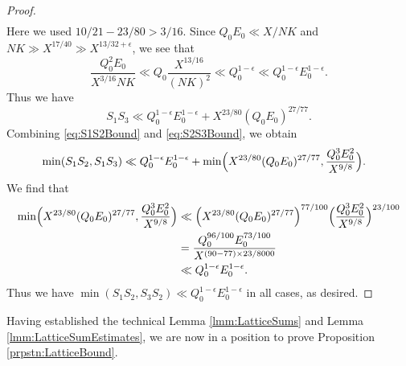 \documentclass[10pt]{amsart}
\theoremstyle{plain}
\numberwithin{sblmm}{thrm}
\numberwithin{equation}{section}
\begin{document}
\begin{proof}
\begin{align*}
\end{align*}
%
Here we used $10/21-23/80>3/16$. Since $Q_0 E_0\ll X/N K$ and $N K\gg X^{17/40}\gg X^{13/32+\epsilon}$, we see that
\[
\frac{Q_0^2 E_0}{X^{3/16}N K}\ll Q_0\frac{X^{13/16}}{(N K)^2}\ll Q_0^{1-\epsilon}\ll Q_0^{1-\epsilon}E_0^{1-\epsilon}.
\]
Thus we have
%
\begin{equation}
S_1S_3\ll Q_0^{1-\epsilon}E_0^{1-\epsilon}+ X^{23/80}(Q_0 E_0)^{27/77}.
\label{eq:S2S3Bound}
\end{equation}
%
Combining \eqref{eq:S1S2Bound} and \eqref{eq:S2S3Bound}, we obtain
%
\begin{align*}
&\min(S_1S_2,S_1S_3)\ll Q_0^{1-\epsilon}E_0^{1-\epsilon}+\min\Bigl(X^{23/80}(Q_0E_0)^{27/77},\frac{Q_0^3 E_0^2}{X^{9/8}}\Bigr).
\end{align*}
%
We find that
\begin{align*}
\min\Bigl(X^{23/80}(Q_0E_0)^{27/77},\frac{Q_0^3E_0^2}{X^{9/8}}\Bigr)&\ll \Bigl(X^{23/80}(Q_0E_0)^{27/77}\Bigr)^{77/100}\Bigl(\frac{Q_0^3E_0^2}{X^{9/8}}\Bigr)^{23/100}\\
&=\frac{Q_0^{96/100}E_0^{73/100}}{X^{(90-77)\times 23/8000}}\\
&\ll Q_0^{1-\epsilon}E_0^{1-\epsilon}.
\end{align*}
Thus we have $\min(S_1S_2,S_3S_2)\ll Q_0^{1-\epsilon}E_0^{1-\epsilon}$ in all cases, as desired.
\end{proof}
%
%
%
%
Having established the technical Lemma \ref{lmm:LatticeSums} and Lemma \ref{lmm:LatticeSumEstimates}, we are now in a position to prove Proposition \ref{prpstn:LatticeBound}.
%
%
%
%
\end{document}
